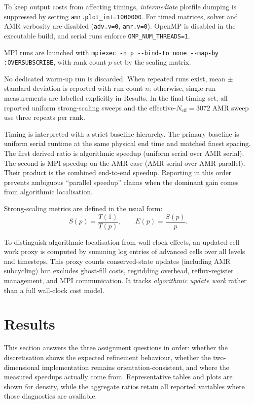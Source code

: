\documentclass[final,3p,times,twocolumn]{elsarticle}
\begin{document}
To keep output costs from affecting timings, \emph{intermediate} plotfile dumping is suppressed by setting \texttt{amr.plot\_int=1000000}. For timed matrices, solver and AMR verbosity are disabled (\texttt{adv.v=0}, \texttt{amr.v=0}). OpenMP is disabled in the executable build, and serial runs enforce \texttt{OMP\_NUM\_THREADS=1}.

MPI runs are launched with \lstinline|mpiexec -n p --bind-to none --map-by :OVERSUBSCRIBE|, with rank count $p$ set by the scaling matrix.

No dedicated warm-up run is discarded. When repeated runs exist, mean $\pm$ standard deviation is reported with run count $n$; otherwise, single-run measurements are labelled explicitly in Results. In the final timing set, all reported uniform strong-scaling sweeps and the effective-$N_\mathrm{eff}=3072$ AMR sweep use three repeats per rank.

Timing is interpreted with a strict baseline hierarchy. The primary baseline is uniform serial runtime at the same physical end time and matched finest spacing. The first derived ratio is algorithmic speedup (uniform serial over AMR serial). The second is MPI speedup on the AMR case (AMR serial over AMR parallel). Their product is the combined end-to-end speedup. Reporting in this order prevents ambiguous ``parallel speedup'' claims when the dominant gain comes from algorithmic localisation.

Strong-scaling metrics are defined in the usual form:
\begin{equation}
S(p)=\frac{T(1)}{T(p)},\qquad E(p)=\frac{S(p)}{p}.
\end{equation}

To distinguish algorithmic localisation from wall-clock effects, an updated-cell work proxy is computed by summing log entries of advanced cells over all levels and timesteps. This proxy counts conserved-state updates (including AMR subcycling) but excludes ghost-fill costs, regridding overhead, reflux-register management, and MPI communication. It tracks \emph{algorithmic update work} rather than a full wall-clock cost model.

\section{Results}
\label{sec:results}

This section answers the three assignment questions in order: whether the discretisation shows the expected refinement behaviour, whether the two-dimensional implementation remains orientation-consistent, and where the measured speedups actually come from. Representative tables and plots are shown for density, while the aggregate ratios retain all reported variables where those diagnostics are available.
\end{document}
